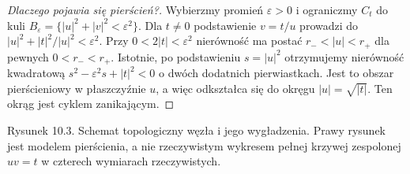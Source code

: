 \documentclass[11pt,a4paper,openany]{report}
\numberwithin{equation}{section}
\theoremstyle{plain}
\theoremstyle{definition}
\theoremstyle{remark}
\begin{document}
\begin{proof}[Dlaczego pojawia się pierścień?]
Wybierzmy promień $\varepsilon>0$ i ograniczmy $C_t$
do kuli $B_\varepsilon=\{|u|^2+|v|^2<\varepsilon^2\}$.
Dla $t\ne0$ podstawienie $v=t/u$ prowadzi do
$|u|^2+|t|^2/|u|^2<\varepsilon^2$.
Przy $0<2|t|<\varepsilon^2$ nierówność ma postać
$r_-<|u|<r_+$ dla pewnych $0<r_-<r_+$.
Istotnie, po podstawieniu $s=|u|^2$ otrzymujemy
nierówność kwadratową $s^2-\varepsilon^2s+|t|^2<0$
o dwóch dodatnich pierwiastkach.
Jest to obszar pierścieniowy w płaszczyźnie $u$,
a więc odkształca się do okręgu $|u|=\sqrt{|t|}$.
Ten okrąg jest cyklem zanikającym.
\end{proof}

\begin{center}

{\small Rysunek 10.3. Schemat topologiczny węzła i jego wygładzenia.
Prawy rysunek jest modelem pierścienia, a nie rzeczywistym wykresem
pełnej krzywej zespolonej $uv=t$ w czterech wymiarach rzeczywistych.}\par
\end{center}
\end{document}
